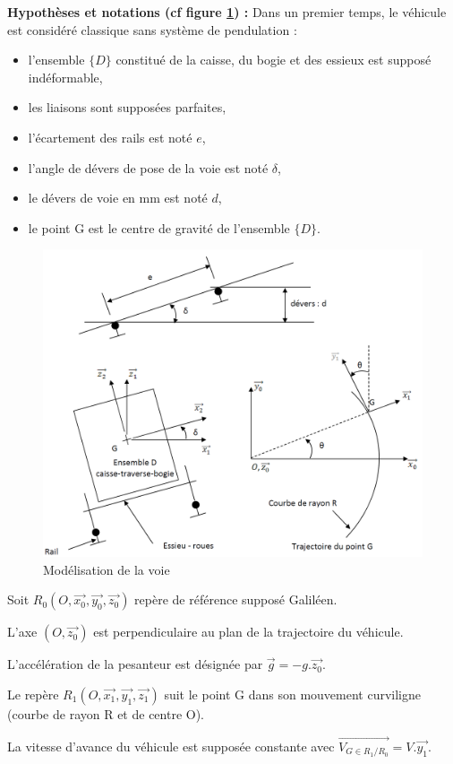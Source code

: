 \textbf{Hypothèses et notations (cf figure \ref{img06}) :}
Dans un premier temps, le véhicule est considéré classique sans système de pendulation :
\begin{itemize}
 \item l'ensemble $\{D\}$ constitué de la caisse, du bogie et des essieux est supposé indéformable,
 \item les liaisons sont supposées parfaites,
 \item l'écartement des rails est noté $e$,
 \item l'angle de dévers de pose de la voie est noté $\delta$,
 \item le dévers de voie en mm est noté $d$,
 \item le point G est le centre de gravité de l'ensemble $\{D\}$.
\end{itemize}

\newpage

\begin{figure}[!h]
 \centering\includegraphics[width=0.7\linewidth]{img/fig6}
 \caption{Modélisation de la voie}
 \label{img06}
\end{figure}

Soit $R_0(O,\overrightarrow{x_0},\overrightarrow{y_0},\overrightarrow{z_0})$ repère de référence supposé Galiléen.

L'axe $(O,\overrightarrow{z_0})$ est perpendiculaire au plan de la trajectoire du véhicule.

L'accélération de la pesanteur est désignée par $\overrightarrow{g}=-g.\overrightarrow{z_0}$.

Le repère $R_1(O,\overrightarrow{x_1},\overrightarrow{y_1},\overrightarrow{z_1})$ suit le point G dans son mouvement curviligne (courbe de rayon R et de centre O).

La vitesse d'avance du véhicule est supposée constante avec $\overrightarrow{V_{G\in R_1/R_0}}=V.\overrightarrow{y_1}$.

